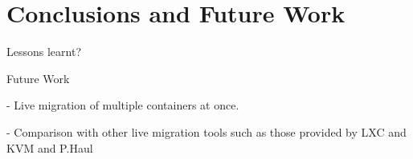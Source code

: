 \chapter{Conclusions and Future Work} \label{chap:conclusion}

Lessons learnt?

Future Work

- Live migration of multiple containers at once.

- Comparison with other live migration tools such as those provided by LXC and KVM and P.Haul
